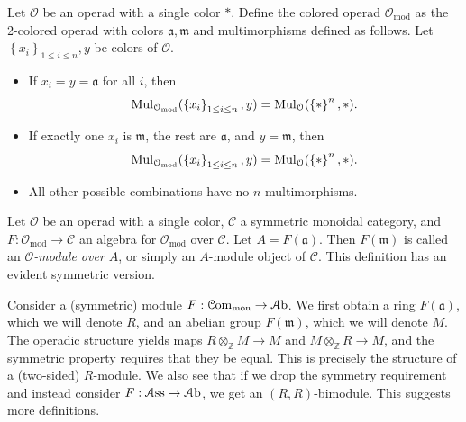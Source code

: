 \begin{definition}\label{1.4.3}
	Let $\mathcal{O} $ be an operad with a single color $*$. Define the colored operad $\mathcal{O} _{\mathrm{mod} } $ as the 2-colored operad with colors $\mathfrak{a} ,\mathfrak{m} $ and multimorphisms defined as follows. Let $\left\{ x_i \right\}_{1\leq i\leq n} ,y$ be colors of $\mathcal{O} $.
	\begin{itemize}
		\item If $x_i=y=\mathfrak{a} $ for all $i$, then
	\[
		\operatorname{Mul}_{\mathcal{O} _{\mathrm{mod} } } (\left\{ x_i \right\} _{1\leq i\leq n} ,y)=\operatorname{Mul}_{\mathcal{O} } (\left\{ * \right\} ^n ,*)
	.\]
		\item If exactly one $x_i$ is $\mathfrak{m} $, the rest are $\mathfrak{a} $, and $y=\mathfrak{m} $, then 
	\[
		\operatorname{Mul}_{\mathcal{O} _{\mathrm{mod} } } (\left\{ x_i \right\} _{1\leq i\leq n} ,y)=\operatorname{Mul}_{\mathcal{O} } (\left\{ * \right\}^n ,*)
	.\]
		\item All other possible combinations have no $n$-multimorphisms.
	\end{itemize}
\end{definition}

\begin{definition}\label{1.4.4}
	Let $\mathcal{O} $ be an operad with a single color, $\mathcal{C} $ a symmetric monoidal category, and $F : \mathcal{O} _{\mathrm{mod} }  \to \mathcal{C} $ an algebra for $\mathcal{O} _{\mathrm{mod} } $ over $\mathcal{C} $. Let $A=F(\mathfrak{a} )$. Then $F(\mathfrak{m} )$ is called an \emph{$\mathcal{O} $-module over $A$}, or simply an $A$-module object of $\mathcal{C} $. This definition has an evident symmetric version.
\end{definition}

\begin{example}\label{1.4.5}
	Consider a (symmetric) module $F : \mathcal{C} \mathrm{om}_{\mathrm{mon} }  \to \mathcal{A}\mathrm{b} $. We first obtain a ring $F(\mathfrak{a})$, which we will denote $R$, and an abelian group $F(\mathfrak{m} )$, which we will denote $M$. The operadic structure yields maps $R\otimes _\mathbb{Z} M\to M$ and $M\otimes _\mathbb{Z} R\to M$, and the symmetric property requires that they be equal. This is precisely the structure of a (two-sided) $R$-module. We also see that if we drop the symmetry requirement and instead consider $F : \mathcal{A} \mathrm{ss}  \to \mathcal{A}\mathrm{b} $, we get an $(R,R)$-bimodule. This suggests more definitions.
\end{example}

